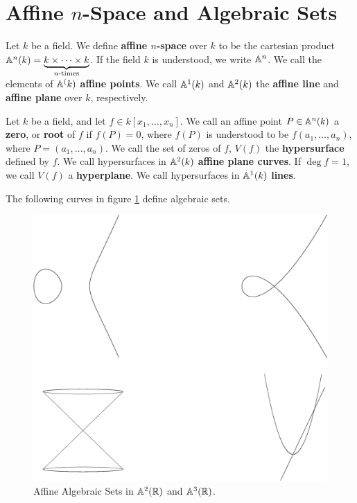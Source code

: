 \section{Affine $n$-Space and Algebraic Sets}

\begin{definition}
    Let $k$ be a field. We define  \textbf{affine $n$-space} over $k$ to be the
    cartesian product  $\mathbb{A}^n(k) = \underbrace{k \times \dots \times
    k}_{n\text{-times}}$. If the field $k$ is understood, we write  $\mathbb{A}^n$. We
    call the elements of  $\mathbb{A}^(k)$ \textbf{affine points}. We call $\mathbb{A}^1(k)$ and
    $\mathbb{A}^2(k)$ the \textbf{affine line} and \textbf{affine plane} over $k$,
    respectively.
\end{definition}

\begin{definition}
    Let $k$ be a field, and let  $f \in k[x_1, \dots, x_n]$. We call an affine
    point $P \in \mathbb{A}^n(k)$ a \textbf{zero}, or \textbf{root} of $f$ if $f(P)=0$,
    where $f(P)$ is understood to be $f(a_1, \dots, a_n)$, where $P=(a_1, \dots,
    a_n)$. We call the set of zeros of $f$, $V(f)$ the \textbf{hypersurface}
    defined by $f$. We call hypersurfaces in  $\mathbb{A}^2(k)$ \textbf{affine plane
    curves}. If $\deg{f}=1$, we call $V(f)$ a \textbf{hyperplane}. We call
    hypersurfaces in $\mathbb{A}^1(k)$ \textbf{lines}.
\end{definition}

\begin{example}\label{example_1.4}
    The following curves in figure \ref{figure_1.1} define algebraic sets.
    \begin{figure}[h]
        \centering
        \includegraphics[scale=0.5]{Figures/Chapter1/hyperplanes.eps}
        \caption{Affine Algebraic Sets in $\mathbb{A}^2(\mathbb{R})$ and $\mathbb{A}^3(\mathbb{R})$.}
        \label{figure_1.1}
    \end{figure}
\end{example}

